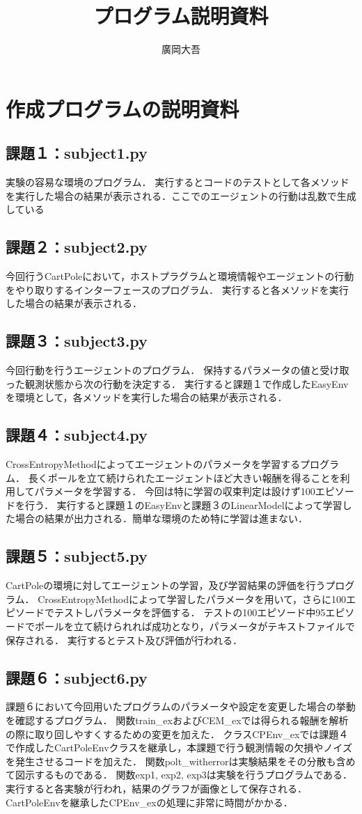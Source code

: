 \documentclass{jsarticle}
\title{\vspace{-4cm}プログラム説明資料}
\author{廣岡大吾}
\begin{document}
\maketitle
\vspace{-1cm}
\section{作成プログラムの説明資料}

\subsection{課題１：subject1.py}
実験の容易な環境のプログラム．
実行するとコードのテストとして各メソッドを実行した場合の結果が表示される．ここでのエージェントの行動は乱数で生成している
\subsection{課題２：subject2.py}
今回行うCartPoleにおいて，ホストプラグラムと環境情報やエージェントの行動をやり取りするインターフェースのプログラム．
実行すると各メソッドを実行した場合の結果が表示される．
\subsection{課題３：subject3.py}
今回行動を行うエージェントのプログラム．
保持するパラメータの値と受け取った観測状態から次の行動を決定する．
実行すると課題１で作成したEasyEnvを環境として，各メソッドを実行した場合の結果が表示される．
\subsection{課題４：subject4.py}
CrossEntropyMethodによってエージェントのパラメータを学習するプログラム．
長くポールを立て続けられたエージェントほど大きい報酬を得ることを利用してパラメータを学習する．
今回は特に学習の収束判定は設けず100エピソードを行う．
実行すると課題１のEasyEnvと課題３のLinearModelによって学習した場合の結果が出力される．簡単な環境のため特に学習は進まない．
\subsection{課題５：subject5.py}
CartPoleの環境に対してエージェントの学習，及び学習結果の評価を行うプログラム．
CrossEntropyMethodによって学習したパラメータを用いて，さらに100エピソードでテストしパラメータを評価する．
テストの100エピソード中95エピソードでポールを立て続けられれば成功となり，パラメータがテキストファイルで保存される．
実行するとテスト及び評価が行われる．
\subsection{課題６：subject6.py}
課題６において今回用いたプログラムのパラメータや設定を変更した場合の挙動を確認するプログラム．
関数train\_exおよびCEM\_exでは得られる報酬を解析の際に取り回しやすくするための変更を加えた．
クラスCPEnv\_exでは課題４で作成したCartPoleEnvクラスを継承し，本課題で行う観測情報の欠損やノイズを発生させるコードを加えた．
関数polt\_witherrorは実験結果をその分散も含めて図示するものである．
関数exp1, exp2, exp3は実験を行うプログラムである．
実行すると各実験が行われ，結果のグラフが画像として保存される．CartPoleEnvを継承したCPEnv\_exの処理に非常に時間がかかる．
\end{document}
